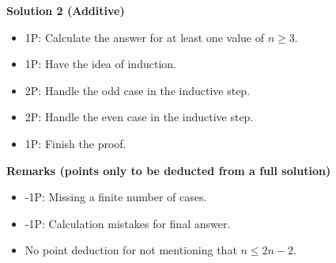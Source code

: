 {\textbf{Solution 2 (Additive)}
\begin{itemize}
\item 1P: Calculate the answer for at least one value of $n \geq 3$.
\item 1P: Have the idea of induction.
\item 2P: Handle the odd case in the inductive step.
\item 2P: Handle the even case in the inductive step.
\item 1P: Finish the proof.
\end{itemize}

\textbf{Remarks (points only to be deducted from a full solution)}
\begin{itemize}
\item -1P: Missing a finite number of cases.
\item -1P: Calculation mistakes for final answer.
\item No point deduction for not mentioning that $n \leq 2n-2$.
\end{itemize}
}

